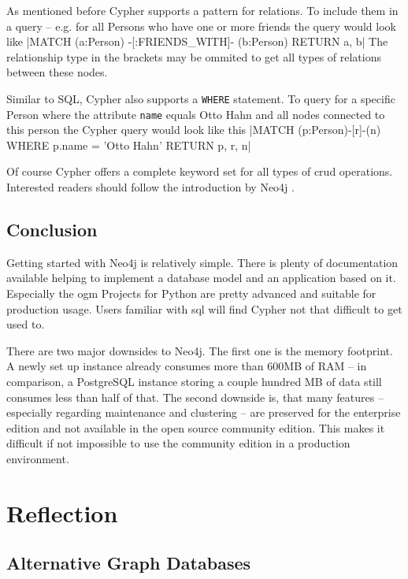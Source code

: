 As mentioned before Cypher supports a pattern for relations.
To include them in a query -- e.g. for all Persons who have one or more friends the query would look like |MATCH (a:Person) -[:FRIENDS_WITH]- (b:Person) RETURN a, b|
The relationship type in the brackets may be ommited to get all types of relations between these nodes.

Similar to SQL, Cypher also supports a \texttt{WHERE} statement.
To query for a specific Person where the attribute \texttt{name} equals \glqq Otto Hahn\grqq{} and all nodes connected to this person the Cypher query would look like this |MATCH (p:Person)-[r]-(n) WHERE p.name = 'Otto Hahn' RETURN p, r, n|

Of course Cypher offers a complete keyword set for all types of \gls{crud} operations. Interested readers should follow the introduction by Neo4j \autocite{neo4j:cypher_introduction}.

\subsection{Conclusion}
Getting started with Neo4j is relatively simple.
There is plenty of documentation available helping to implement a database model and an application based on it.
Especially the \gls{ogm} Projects for Python are pretty advanced and suitable for production usage.
Users familiar with \gls{sql} will find Cypher not that difficult to get used to.

There are two major downsides to Neo4j. The first one is the memory footprint.
A newly set up instance already consumes more than 600MB of RAM -- in comparison, a PostgreSQL instance storing a couple hundred MB of data still consumes less than half of that.
The second downside is, that many features -- especially regarding maintenance and clustering -- are preserved for the enterprise edition and not available in the open source community edition. This makes it difficult if not impossible to use the community edition in a production environment.

\section{Reflection} \label{section4}
\subsection{Alternative Graph Databases}
